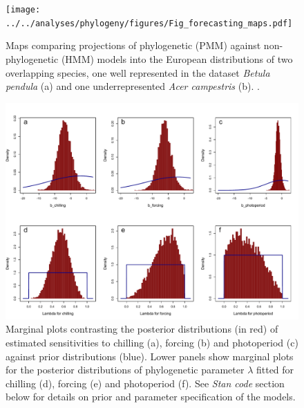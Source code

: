 \documentclass[11pt]{article}
\begin{document}
\clearpage
\begin{figure}
  \begin{center}
  \texttt{[image: ../../analyses/phylogeny/figures/Fig\_forecasting\_maps.pdf]}
  \caption{Maps comparing projections of phylogenetic (PMM) against non-phylogenetic (HMM) models into the European distributions of two overlapping species, one well represented in the dataset \emph{Betula pendula} (a) and one underrepresented \emph{Acer campestris} (b).  .}
  \label{fig:pmmvshmm}
  \end{center}
\end{figure}


\clearpage
\begin{figure}
  \begin{center}
  \includegraphics[width=14cm]{../../analyses/phylogeny/figures/FigSXX_marginal_plots_betas_lambda.pdf}
  \caption{Marginal plots contrasting the posterior distributions (in red) of estimated sensitivities to chilling (a), forcing (b) and photoperiod (c) against prior distributions (blue). Lower panels show marginal plots for the posterior distributions of phylogenetic parameter $\lambda$ fitted for chilling (d), forcing (e) and photoperiod (f). See \emph{Stan code} section below for details on prior and parameter specification of the models.}
  \label{fig:marginalplots}
  \end{center}
\end{figure}
\end{document}
